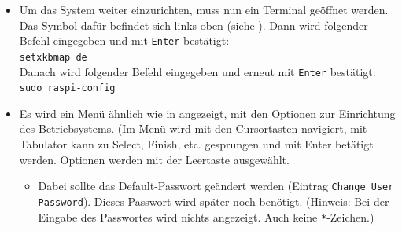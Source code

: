 \begin{itemize}
{		}
	\item {Um das System weiter einzurichten, muss nun ein Terminal geöffnet werden.
		Das Symbol dafür befindet sich links oben (siehe ).
		Dann wird folgender Befehl eingegeben und mit \lstinline|Enter| bestätigt:\\
		\lstinline|setxkbmap de|\\
		Danach wird folgender Befehl eingegeben und erneut mit \lstinline|Enter| bestätigt:\\
		\lstinline|sudo raspi-config|
		}
	\item {Es wird ein Menü ähnlich wie in  angezeigt, mit den Optionen zur Einrichtung des Betriebsystems. 
		(Im Menü wird mit den Cursortasten navigiert, mit Tabulator kann zu Select, Finish, etc. gesprungen und mit Enter betätigt werden. Optionen werden mit der Leertaste ausgewählt.
		\begin{itemize}
		\item {Dabei sollte das Default-Passwort geändert werden (Eintrag \lstinline|Change User Password|). Dieses Passwort wird später noch benötigt.
			(Hinweis: Bei der Eingabe des Passwortes wird nichts angezeigt. Auch keine \lstinline|*|-Zeichen.)}

\end{itemize}}
\end{itemize}
